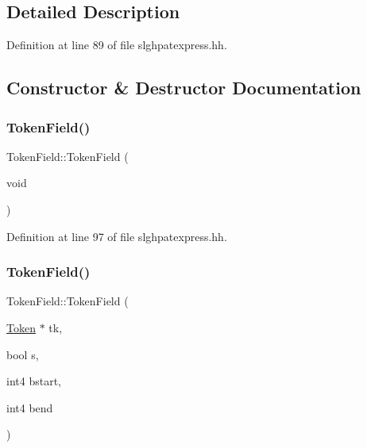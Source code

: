 \subsection{Detailed Description}


Definition at line 89 of file slghpatexpress.\+hh.



\subsection{Constructor \& Destructor Documentation}
\mbox{\label{class_token_field_a5885b09edefdc42f4d4ce375afdd0d9a}} 
\subsubsection{\texorpdfstring{TokenField()}{TokenField()}\hspace{0.1cm}{\footnotesize\ttfamily [1/2]}}
{\footnotesize\ttfamily Token\+Field\+::\+Token\+Field (\begin{DoxyParamCaption}\item[{void}]{ }\end{DoxyParamCaption})\hspace{0.3cm}{\ttfamily [inline]}}



Definition at line 97 of file slghpatexpress.\+hh.

\mbox{\label{class_token_field_a1bfdc53c1f698232c5af0e89cc14107c}} 
\subsubsection{\texorpdfstring{TokenField()}{TokenField()}\hspace{0.1cm}{\footnotesize\ttfamily [2/2]}}
{\footnotesize\ttfamily Token\+Field\+::\+Token\+Field (\begin{DoxyParamCaption}\item[{\mbox{\hyperlink{class_token}{Token}} $\ast$}]{tk,  }\item[{bool}]{s,  }\item[{int4}]{bstart,  }\item[{int4}]{bend }\end{DoxyParamCaption})}



